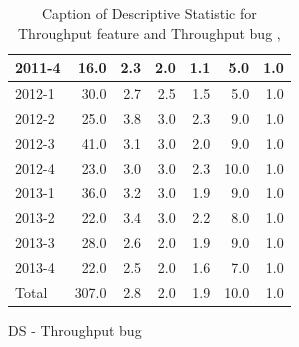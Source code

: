\documentclass[UKenglish]{ifimaster}  %
\begin{document}
\begin{appendices}
\begin{table}[!htbp]
\begin{adjustwidth}{-2.5cm}{}
\begin{subfigure}[b]{0.3\textwidth}
{\begin{tabular}{ | l | r | r | r | r | r | r | }
2011-4 & 16.0 & 2.3 & 2.0 & 1.1 & 5.0 & 1.0\\ \hline
2012-1 & 30.0 & 2.7 & 2.5 & 1.5 & 5.0 & 1.0\\ \hline
2012-2 & 25.0 & 3.8 & 3.0 & 2.3 & 9.0 & 1.0\\ \hline
2012-3 & 41.0 & 3.1 & 3.0 & 2.0 & 9.0 & 1.0\\ \hline
2012-4 & 23.0 & 3.0 & 3.0 & 2.3 & 10.0 & 1.0\\ \hline
2013-1 & 36.0 & 3.2 & 3.0 & 1.9 & 9.0 & 1.0\\ \hline
2013-2 & 22.0 & 3.4 & 3.0 & 2.2 & 8.0 & 1.0\\ \hline
2013-3 & 28.0 & 2.6 & 2.0 & 1.9 & 9.0 & 1.0\\ \hline
2013-4 & 22.0 & 2.5 & 2.0 & 1.6 & 7.0 & 1.0\\ \hline
Total & 307.0 & 2.8 & 2.0 & 1.9 & 10.0 & 1.0\\ \hline
\end{tabular}
}
\caption{DS - Throughput bug}
 \label{DS:TPB:9}
\end{subfigure}
\end{adjustwidth}
\caption[Optional caption for list of figures]{Caption of Descriptive Statistic for Throughput feature and Throughput bug  , }
\label{DS:9:2}
\end{table}




\end{appendices}
\end{document}
